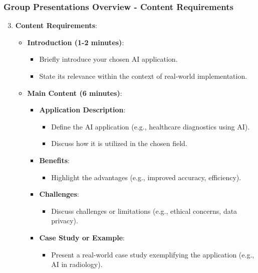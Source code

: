 \documentclass[aspectratio=169]{beamer}
\begin{document}
\begin{frame}[fragile]
    \frametitle{Group Presentations Overview - Content Requirements}
    \begin{enumerate}
        \setcounter{enumi}{2}
        \item \textbf{Content Requirements}:
            \begin{itemize}
                \item \textbf{Introduction (1-2 minutes)}:
                    \begin{itemize}
                        \item Briefly introduce your chosen AI application.
                        \item State its relevance within the context of real-world implementation.
                    \end{itemize}
                \item \textbf{Main Content (6 minutes)}:
                    \begin{itemize}
                        \item \textbf{Application Description}:
                            \begin{itemize}
                                \item Define the AI application (e.g., healthcare diagnostics using AI).
                                \item Discuss how it is utilized in the chosen field.
                            \end{itemize}
                        \item \textbf{Benefits}:
                            \begin{itemize}
                                \item Highlight the advantages (e.g., improved accuracy, efficiency).
                            \end{itemize}
                        \item \textbf{Challenges}:
                            \begin{itemize}
                                \item Discuss challenges or limitations (e.g., ethical concerns, data privacy).
                            \end{itemize}
                        \item \textbf{Case Study or Example}:
                            \begin{itemize}
                                \item Present a real-world case study exemplifying the application (e.g., AI in radiology).

\end{itemize}
\end{itemize}
\end{itemize}
\end{enumerate}
\end{frame}
\end{document}

